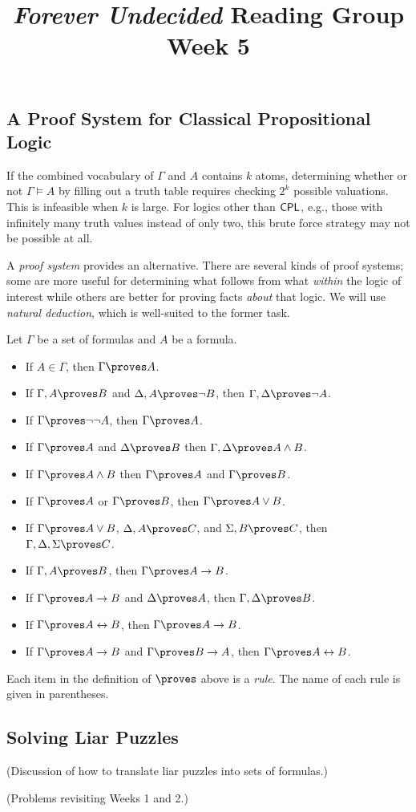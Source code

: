 \documentclass{article}
\title{\emph{Forever Undecided} Reading Group \\ Week 5}
\date{}
\author{}
\begin{document}
\maketitle

\subsection*{A Proof System for Classical Propositional Logic}

If the combined vocabulary of $\Gamma$ and $A$ contains $k$ atoms, determining whether or not $\Gamma \models A$ by filling out a truth table requires checking $2^k$ possible valuations. This is infeasible when $k$ is large. For logics other than $\mathsf{CPL}$, e.g., those with infinitely many truth values instead of only two, this brute force strategy may not be possible at all.

A \textit{proof system} provides an alternative. There are several kinds of proof systems; some are more useful for determining what follows from what \textit{within} the logic of interest while others are better for proving facts \textit{about} that logic. We will use \textit{natural deduction}, which is well-suited to the former task.

\begin{definition}
    Let $\Gamma$ be a set of formulas and $A$ be a formula. 
    \begin{itemize}
        \item If $A \in \Gamma$, then $\Gamma \proves A$.
        \item If $\Gamma, A \proves B$ and $\Delta, A \proves \neg B$, then $\Gamma, \Delta \proves \neg A$. 
        \item If $\Gamma \proves \neg \neg A$, then $\Gamma \proves A$.
        \item If $\Gamma \proves A$ and $\Delta \proves B$ then $\Gamma, \Delta \proves A \wedge B$. 
        \item If $\Gamma \proves A \wedge B$ then $\Gamma \proves A$ and $\Gamma \proves B$.
        \item If $\Gamma \proves A$ or $\Gamma \proves B$, then $\Gamma \proves A \vee B$. 
        \item If $\Gamma \proves A \vee B$, $\Delta, A \proves C$, and $\Sigma, B \proves C$, then $\Gamma, \Delta, \Sigma \proves C$.
        \item If $\Gamma, A \proves B$, then $\Gamma \proves A \to B$. \item If $\Gamma \proves A \to B$ and $\Delta \proves A$, then $\Gamma, \Delta \proves B$.
        \item If $\Gamma \proves A \iff B$, then $\Gamma \proves A \to B$. 
        \item If $\Gamma \proves A \to B$ and $\Gamma \proves B \to A$, then $\Gamma \proves A \iff B$.
    \end{itemize}
\end{definition}

Each item in the definition of $\proves$ above is a \textit{rule}. The name of each rule is given in parentheses.

\subsection*{Solving Liar Puzzles}

(Discussion of how to translate liar puzzles into sets of formulas.)

(Problems revisiting Weeks 1 and 2.)
\end{document}
